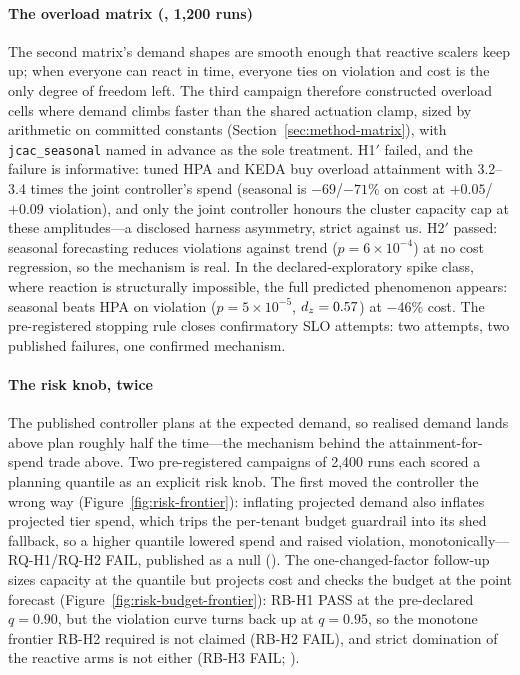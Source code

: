 \paragraph{The overload matrix (, 1,200 runs)}
The second matrix's demand shapes are smooth enough that reactive scalers
keep up; when everyone can react in time, everyone ties on violation and
cost is the only degree of freedom left. The third campaign therefore
constructed overload cells where demand climbs faster than the shared
actuation clamp, sized by arithmetic on committed constants
(Section~\ref{sec:method-matrix}), with \texttt{jcac\_seasonal} named in
advance as the sole treatment. H1$'$ failed, and the failure is
informative: tuned HPA and KEDA buy overload attainment with 3.2--3.4
times the joint controller's spend (seasonal is $-69$/$-71\%$ on cost at
$+0.05$/$+0.09$ violation), and only the joint controller honours the
cluster capacity cap at these amplitudes---a disclosed harness asymmetry,
strict against us. H2$'$ passed: seasonal forecasting reduces violations
against trend ($p = 6{\times}10^{-4}$) at no cost regression, so the
mechanism is real. In the declared-exploratory spike class, where reaction
is structurally impossible, the full predicted phenomenon appears:
seasonal beats HPA on violation ($p = 5{\times}10^{-5}$, $d_z = 0.57$) at
$-46\%$ cost. The pre-registered stopping rule closes confirmatory SLO
attempts: two attempts, two published failures, one confirmed mechanism.

\paragraph{The risk knob, twice} The published controller plans at the
expected demand, so realised demand lands above plan roughly half the
time---the mechanism behind the attainment-for-spend trade above. Two
pre-registered campaigns of 2,400 runs each scored a planning quantile as
an explicit risk knob. The first moved the controller the wrong way
(Figure~\ref{fig:risk-frontier}): inflating projected demand also inflates
projected tier spend, which trips the per-tenant budget guardrail into its
shed fallback, so a higher quantile lowered spend and raised violation,
monotonically---RQ-H1/RQ-H2 FAIL, published as a null
(). The one-changed-factor follow-up sizes
capacity at the quantile but projects cost and checks the budget at the
point forecast (Figure~\ref{fig:risk-budget-frontier}): RB-H1 PASS at the
pre-declared $q = 0.90$, but the violation curve turns back up at $q =
0.95$, so the monotone frontier RB-H2 required is not claimed (RB-H2
FAIL), and strict domination of the reactive arms is not either (RB-H3
FAIL; ).

